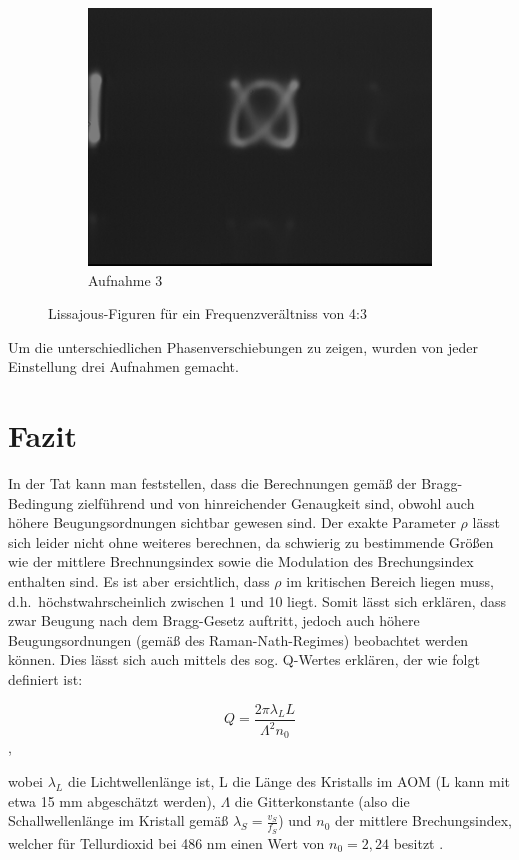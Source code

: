 \documentclass[bigchapter,colorback,accentcolor=tud4b,linedtoc,11pt]{tudreport}
\begin{document}
\begin{figure}[H]
\begin{subfigure}[h]{0.32\textwidth}
    \includegraphics[width=\textwidth]{data/Aufgabe7/4-3-y.png}
    \caption[Cap for listoffigures]{Aufnahme 3}
  \end{subfigure}%
  \caption{Lissajous-Figuren für ein Frequenzverältniss von 4:3}
\end{figure}

Um die unterschiedlichen Phasenverschiebungen zu zeigen, wurden von jeder Einstellung drei Aufnahmen gemacht.


\chapter{Fazit}

In der Tat kann man feststellen, dass die Berechnungen gemäß der Bragg-Bedingung zielführend und von hinreichender Genaugkeit sind, obwohl auch höhere Beugungsordnungen sichtbar gewesen sind. Der exakte Parameter $\rho$ lässt sich leider nicht ohne weiteres berechnen, da schwierig zu bestimmende Größen wie der mittlere Brechnungsindex sowie die Modulation des Brechungsindex enthalten sind. Es ist aber ersichtlich, dass $\rho$ im kritischen Bereich liegen muss, d.h.\ höchstwahrscheinlich zwischen 1 und 10 liegt. Somit lässt sich erklären, dass zwar Beugung nach dem Bragg-Gesetz auftritt, jedoch auch höhere Beugungsordnungen (gemäß des Raman-Nath-Regimes) beobachtet werden können. Dies lässt sich auch mittels des sog. Q-Wertes erklären, der wie folgt definiert ist: 

$$Q = \frac{2 \pi \lambda_L L}{\Lambda^2 n_0}$$,

wobei $\lambda_L$ die Lichtwellenlänge ist, L die Länge des Kristalls im AOM (L kann mit etwa 15 mm abgeschätzt werden), $\Lambda$ die Gitterkonstante (also die Schallwellenlänge im Kristall gemäß $\lambda_S = \frac{v_S}{f_S}$) und $n_0$ der mittlere Brechungsindex, welcher für Tellurdioxid bei 486 nm einen Wert von $n_0 = 2,24$ besitzt \cite{wiki}.
\end{document}
